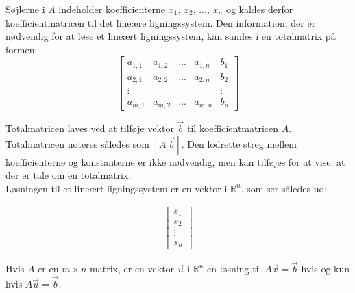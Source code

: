Søjlerne i $A$ indeholder koefficienterne $x_1$, $x_2$, $\dots $, $x_n$ og kaldes derfor koefficientmatricen til det lineære ligningssystem. 
Den information, der er nødvendig for at løse et lineært ligningssystem, kan samles i en totalmatrix på formen:
\[
\left[
\begin{array}{cccc|c}
a_{1,1} & a_{1,2} & \dots & a_{1,n} & b_1 \\
a_{2,1} & a_{2,2} & \dots & a_{2,n} & b_2 \\
\vdots  &         &       &         & \vdots \\
a_{m,1} & a_{m,2} & \dots & a_{m,n} & b_n
\end{array}
\right]
\]

Totalmatricen laves ved at tilføje vektor $\vec{b}$ til koefficientmatricen $A$. Totalmatricen noteres således som $[A \ \vec{b}]$. Den lodrette streg mellem koefficienterne og konstanterne er ikke nødvendig, men kan tilføjes for at vise, at der er tale om en totalmatrix.\\

Løsningen til et lineært ligningssystem er en vektor i $\mathds{R}^n$, som ser således ud:

\begin{align*}
\begin{bmatrix}
s_1 \\
s_2 \\
\vdots \\
s_n
\end{bmatrix}
\end{align*}

Hvis $A$ er en $m \times n$ matrix, er en vektor $\vec{u}$  i $\mathds{R}^n$ en løsning til $A \vec{x}= \vec{b}$ hvis og kun hvis $A \vec{u}= \vec{b}$.

